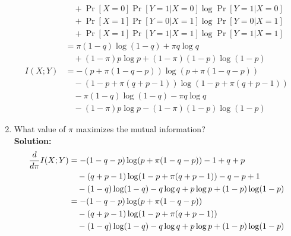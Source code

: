\documentclass{assignment}
\begin{document}
\begin{enumerate}
\begin{align*}
           & \quad + \Pr[X=0]\Pr[Y=1|X=0] \log \Pr[Y=1|X=0] \\
           & \quad + \Pr[X=1]\Pr[Y=0|X=1] \log \Pr[Y=0|X=1] \\
           & \quad + \Pr[X=1]\Pr[Y=1|X=1] \log \Pr[Y=1|X=1] \\
           & = \pi (1 - q) \log (1 - q)  + \pi q \log q \\
           & \quad + (1 - \pi) p \log p + (1 - \pi) (1 - p) \log (1 - p) \\
    I(X;Y) & = - (p + \pi (1 - q - p)) \log (p + \pi (1 - q - p)) \\
           & \quad - (1 - p + \pi (q + p - 1)) \log (1 - p + \pi (q + p - 1)) \\
           & \quad - \pi (1 - q) \log (1 - q)  - \pi q \log q \\
           & \quad - (1 - \pi) p \log p - (1 - \pi) (1 - p) \log (1 - p)
  \end{align*}
\item What value of $\pi$ maximizes the mutual information? \\
  \textbf{Solution:} \\
  \begin{align*}
    \dfrac{d}{d\pi} I(X;Y)
    & = -(1-q-p)\log (p + \pi (1 - q - p)) - 1 + q + p \\
    & \quad - (q + p - 1)\log (1 - p + \pi (q + p - 1)) - q - p + 1 \\
    & \quad - (1 - q) \log (1- q) - q \log q+ p \log p + (1 - p) \log (1 - p) \\
    & = -(1-q-p)\log (p + \pi (1 - q - p)) \\
    & \quad - (q + p - 1)\log (1 - p + \pi (q + p - 1)) \\
    & \quad - (1 - q) \log (1- q) - q \log q+ p \log p + (1 - p) \log (1 - p)
  \end{align*}
\end{enumerate}
\end{document}
